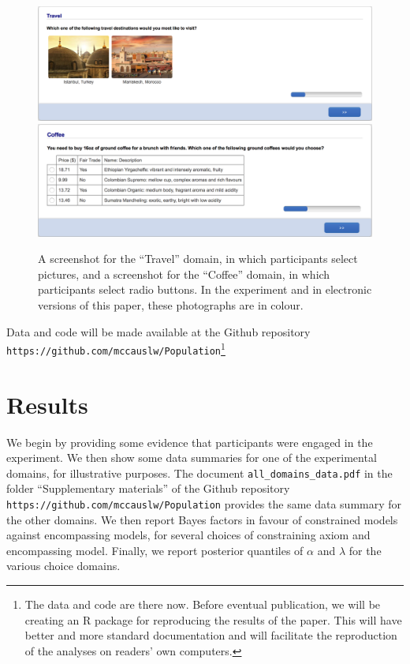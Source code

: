 \documentclass[11pt,letter]{article}
\begin{document}
\begin{figure}
	\begin{center}
	\includegraphics[width=15cm]{Population_study_design/screenshot_Travel.png}
	\includegraphics[width=15cm]{Population_study_design/screenshot_Coffee.png}
	\caption{A screenshot for the ``Travel'' domain, in which participants select pictures, and a screenshot for the ``Coffee'' domain, in which participants select radio buttons. In the experiment and in electronic versions of this paper, these photographs are in colour.}\label{f:screenshots}
	\end{center}
\end{figure}

Data and code will be made available at the Github repository \texttt{https://github.com/mccauslw/Population}\footnote{The data and code are there now. Before eventual publication, we will be creating an R package for reproducing the results of the paper. This will have better and more standard documentation and will facilitate the reproduction of the analyses on readers' own computers.}


\section{Results}\label{s:results}

We begin by providing some evidence that participants were engaged in the experiment.
We then show some data summaries for one of the experimental domains, for illustrative purposes.
The document \texttt{all\_domains\_data.pdf} in the folder ``Supplementary materials'' of the Github repository \texttt{https://github.com/mccauslw/Population} provides the same data summary for the other domains.
We then report Bayes factors in favour of constrained models against encompassing models, for several choices of constraining axiom and encompassing model.
Finally, we report posterior quantiles of $\alpha$ and $\lambda$ for the various choice domains.
\end{document}
